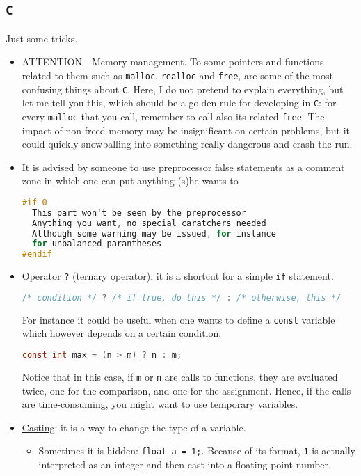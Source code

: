 \documentclass[a4paper,12pt,%
              final%
              ]{article}
\begin{document}
\subsection{\texttt{C}}
Just some tricks.
\begin{itemize}
  \item ATTENTION - Memory management. To some pointers and functions related to them such as \texttt{malloc}, \texttt{realloc} and \texttt{free}, are some of the most confusing things about \texttt{C}. Here, I do not pretend to explain everything, but let me tell you this, which should be a golden rule for developing in \texttt{C}: for every \texttt{malloc} that you call, remember to call also its related \texttt{free}. The impact of non-freed memory may be insignificant on certain problems, but it could quickly snowballing into something really dangerous and crash the run.
  \item It is advised by someone to use preprocessor false statements as a comment zone in which one can put anything (s)he wants to
\begin{lstlisting}[language=C]
#if 0
  This part won't be seen by the preprocessor
  Anything you want, no special caratchers needed
  Although some warning may be issued, for instance
  for unbalanced parantheses
#endif
\end{lstlisting}
  \item Operator \verb|?| (ternary operator): it is a shortcut for a simple \texttt{if} statement.
\begin{lstlisting}[language=C]
/* condition */ ? /* if true, do this */ : /* otherwise, this */
\end{lstlisting}
    For instance it could be useful when one wants to define a \texttt{const} variable which however depends on a certain condition.
\begin{lstlisting}[language=C]
  const int max = (n > m) ? n : m;
\end{lstlisting}
    Notice that in this case, if \verb|m| or \verb|n| are calls to functions, they are evaluated twice, one for the comparison, and one for the assignment. Hence, if the calls are time-consuming, you might want to use temporary variables.
  \item \href{https://www.improgrammer.net/type-casting-c-language/}{Casting}: it is a way to change the type of a variable.
    \begin{itemize}
      \item Sometimes it is hidden: \verb|float a = 1;|. Because of its format, \verb|1| is actually interpreted as an integer and then cast into a floating-point number.

\end{itemize}
\end{itemize}
\end{document}
